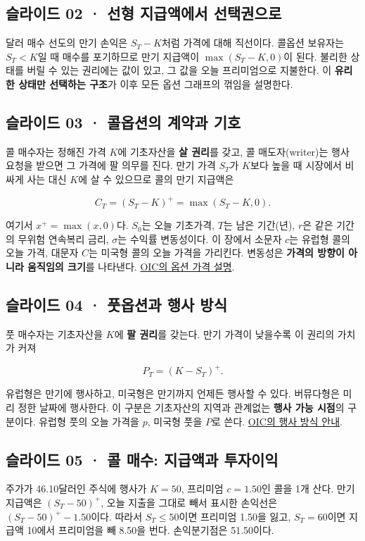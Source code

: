 \documentclass[11pt,a4paper]{article}
\begin{document}
\subsection{슬라이드 02 · 선형 지급액에서 선택권으로}
달러 매수 선도의 만기 손익은 $S_T-K$처럼 가격에 대해 직선이다. 콜옵션 보유자는 $S_T<K$일 때 매수를 포기하므로 만기 지급액이 $\max(S_T-K,0)$이 된다. 불리한 상태를 버릴 수 있는 권리에는 값이 있고, 그 값을 오늘 프리미엄으로 지불한다. 이 \textbf{유리한 상태만 선택하는 구조}가 이후 모든 옵션 그래프의 꺾임을 설명한다.\par

\subsection{슬라이드 03 · 콜옵션의 계약과 기호}
콜 매수자는 정해진 가격 $K$에 기초자산을 \textbf{살 권리}를 갖고, 콜 매도자(writer)는 행사 요청을 받으면 그 가격에 팔 의무를 진다. 만기 가격 $S_T$가 $K$보다 높을 때 시장에서 비싸게 사는 대신 $K$에 살 수 있으므로 콜의 만기 지급액은\par

\[
C_T=(S_T-K)^+=\max(S_T-K,0).
\]

여기서 $x^+=\max(x,0)$다. $S_0$는 오늘 기초가격, $T$는 남은 기간(년), $r$은 같은 기간의 무위험 연속복리 금리, $\sigma$는 수익률 변동성이다. 이 장에서 소문자 $c$는 유럽형 콜의 오늘 가격, 대문자 $C$는 미국형 콜의 오늘 가격을 가리킨다. 변동성은 \textbf{가격의 방향이 아니라 움직임의 크기}를 나타낸다. \href{https://www.optionseducation.org/optionsoverview/options-pricing}{OIC의 옵션 가격 설명}.\par

\subsection{슬라이드 04 · 풋옵션과 행사 방식}
풋 매수자는 기초자산을 $K$에 \textbf{팔 권리}를 갖는다. 만기 가격이 낮을수록 이 권리의 가치가 커져\par

\[
P_T=(K-S_T)^+.
\]

유럽형은 만기에 행사하고, 미국형은 만기까지 언제든 행사할 수 있다. 버뮤다형은 미리 정한 날짜에 행사한다. 이 구분은 기초자산의 지역과 관계없는 \textbf{행사 가능 시점}의 구분이다. 유럽형 풋의 오늘 가격을 $p$, 미국형 풋을 $P$로 쓴다. \href{https://www.optionseducation.org/optionsoverview/exercising-options}{OIC의 행사 방식 안내}.\par

\subsection{슬라이드 05 · 콜 매수: 지급액과 투자이익}
주가가 46.10달러인 주식에 행사가 $K=50$, 프리미엄 $c=1.50$인 콜을 1개 산다. 만기 지급액은 $(S_T-50)^+$, 오늘 지출을 그대로 빼서 표시한 손익선은 $(S_T-50)^+-1.50$이다. 따라서 $S_T\leq50$이면 프리미엄 1.50을 잃고, $S_T=60$이면 지급액 10에서 프리미엄을 빼 8.50을 번다. 손익분기점은 51.50이다.\par
\end{document}
